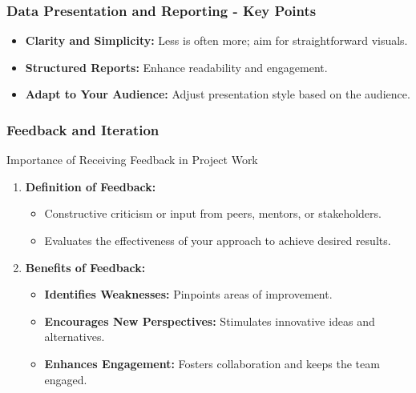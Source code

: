 \documentclass[aspectratio=169]{beamer}
\begin{document}
\begin{frame}[fragile]
    \frametitle{Data Presentation and Reporting - Key Points}
    \begin{itemize}
        \item \textbf{Clarity and Simplicity:} Less is often more; aim for straightforward visuals.
        \item \textbf{Structured Reports:} Enhance readability and engagement.
        \item \textbf{Adapt to Your Audience:} Adjust presentation style based on the audience.
    \end{itemize}
\end{frame}

\begin{frame}[fragile]
    \frametitle{Feedback and Iteration}
    \begin{block}{Importance of Receiving Feedback in Project Work}
        \begin{enumerate}
            \item \textbf{Definition of Feedback:}
            \begin{itemize}
                \item Constructive criticism or input from peers, mentors, or stakeholders.
                \item Evaluates the effectiveness of your approach to achieve desired results.
            \end{itemize}
            
            \item \textbf{Benefits of Feedback:}
            \begin{itemize}
                \item \textbf{Identifies Weaknesses:} Pinpoints areas of improvement.
                \item \textbf{Encourages New Perspectives:} Stimulates innovative ideas and alternatives.
                \item \textbf{Enhances Engagement:} Fosters collaboration and keeps the team engaged.
            \end{itemize}
        \end{enumerate}
    \end{block}
\end{frame}
\end{document}
